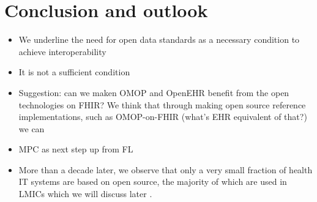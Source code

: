 \documentclass[
  authoryear]{elsarticle}
\providecommand{\tightlist}{%
  \setlength{\itemsep}{0pt}\setlength{\parskip}{0pt}}\usepackage{longtable,booktabs,array}
\begin{document}
\section{Conclusion and outlook}\label{conclusion-and-outlook}

\begin{itemize}
\tightlist
\item
  We underline the need for open data standards as a necessary condition
  to achieve interoperability
\item
  It is not a sufficient condition
\item
  Suggestion: can we maken OMOP and OpenEHR benefit from the open
  technologies on FHIR? We think that through making open source
  reference implementations, such as OMOP-on-FHIR (what's EHR equivalent
  of that?) we can
\item
  MPC as next step up from FL
\item
  More than a decade later, we observe that only a very small fraction
  of health IT systems are based on open source, the majority of which
  are used in LMICs which we will discuss later
  \citep{digitalpublicgoods}.
\end{itemize}


  
\end{document}
